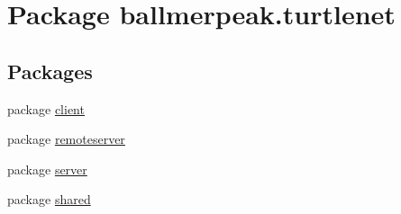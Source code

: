 \hypertarget{namespaceballmerpeak_1_1turtlenet}{\section{Package ballmerpeak.\-turtlenet}
\label{namespaceballmerpeak_1_1turtlenet}
}
\subsection*{Packages}
\begin{DoxyCompactItemize}
\item 
package \hyperlink{namespaceballmerpeak_1_1turtlenet_1_1client}{client}
\item 
package \hyperlink{namespaceballmerpeak_1_1turtlenet_1_1remoteserver}{remoteserver}
\item 
package \hyperlink{namespaceballmerpeak_1_1turtlenet_1_1server}{server}
\item 
package \hyperlink{namespaceballmerpeak_1_1turtlenet_1_1shared}{shared}
\end{DoxyCompactItemize}
